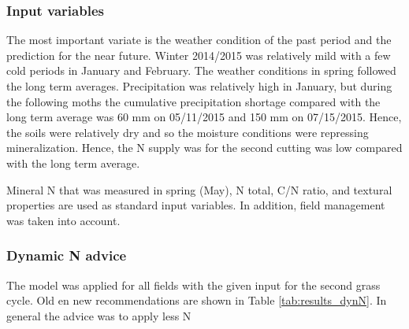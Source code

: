 \documentclass[10pt,twoside,dutch,english]{report}
\begin{document}
\subsubsection{Input variables}
The most important variate is the weather condition of the past period and the prediction for the near future.  Winter 2014/2015 was relatively mild with a few cold periods in January and February. The weather conditions in spring followed the long term averages. Precipitation was relatively high in January, but during the following moths the cumulative precipitation shortage compared with the long term average was 60 mm on 05/11/2015 and 150 mm on 07/15/2015. Hence, the soils were relatively dry and so the moisture conditions were repressing mineralization. Hence, the N supply was for the second cutting was low compared with the long term average. 

Mineral N that was measured in spring (May), N total, C/N ratio, and textural properties are used as standard input variables. In addition, field management was taken into account. 


\subsubsection{Dynamic N advice}
The model was applied for all fields with the given input for the second grass cycle. Old en new recommendations are shown in Table \ref{tab:results_dynN}. In general the advice was to apply less N
\end{document}
